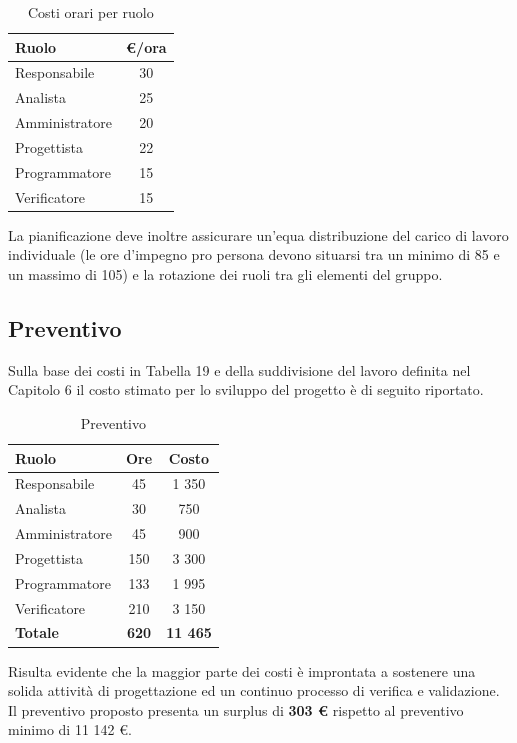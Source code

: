 \documentclass[a4paper,11pt]{article}
\begin{document}
	\begin{table}[h!]
	\begin{center}
		\begin{tabularx}{150pt}{Xc}
			\textbf{Ruolo} & \textbf{\euro/ora}\\
			\midrule
			Responsabile & 30 \\
			Analista & 25 \\
			Amministratore & 20 \\
			Progettista & 22 \\
			Programmatore & 15 \\
			Verificatore & 15 \\
			\midrule
		\end{tabularx}
		\end{center}
	\caption{Costi orari per ruolo}
	\end{table}
	
La pianificazione deve inoltre assicurare un'equa distribuzione del carico di lavoro individuale (le ore d'impegno pro persona devono situarsi tra un minimo di 85 e un massimo di 105) e la rotazione dei ruoli tra gli elementi del gruppo.
	\subsection{Preventivo}
	Sulla base dei costi in Tabella 19 e della suddivisione del lavoro definita nel Capitolo 6 il costo stimato per lo sviluppo del progetto è di seguito riportato.
	\begin{table}[h!]
	\begin{center}
		\begin{tabular}{l c c}
			\textbf{Ruolo} & \textbf{Ore} & \textbf{Costo}\\
			\midrule
			Responsabile & 45 & 1 350\\
			Analista & 30 & 750\\
			Amministratore & 45 & 900\\
			Progettista & 150 & 3 300\\
			Programmatore & 133 & 1 995\\
			Verificatore & 210 & 3 150\\
			\midrule
			\textbf{Totale} & \textbf{620} & \textbf{11 465}
		\end{tabular}
		\end{center}
	\caption{Preventivo}
	\end{table}
	
	Risulta evidente che la maggior parte dei costi è improntata a sostenere una solida attività di progettazione ed un continuo processo di verifica e validazione. Il preventivo proposto presenta un surplus di \textbf{303 \euro} rispetto al preventivo minimo di 11 142 \euro.
\end{document}
